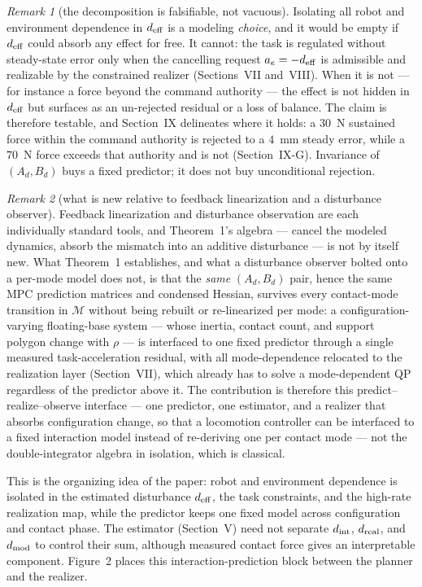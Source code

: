 \documentclass[journal]{IEEEtran}
\theoremstyle{plain}
\theoremstyle{definition}
\theoremstyle{remark}
\newtheorem*{remark}{Remark}
\newcommand{\deff}{d_{\rm eff}}
\begin{document}
\begin{remark}[the decomposition is falsifiable, not vacuous]
Isolating all robot and environment dependence in $\deff$ is a modeling \emph{choice}, and it would be empty if $\deff$ could absorb any effect for free. It cannot: the task is regulated without steady-state error only when the cancelling request $a_e=-\deff$ is admissible and realizable by the constrained realizer (Sections~VII and~VIII). When it is not --- for instance a force beyond the command authority --- the effect is not hidden in $\deff$ but surfaces as an un-rejected residual or a loss of balance. The claim is therefore testable, and Section~IX delineates where it holds: a $30$~N sustained force within the command authority is rejected to a $4$~mm steady error, while a $70$~N force exceeds that authority and is not (Section~IX-G). Invariance of $(A_d,B_d)$ buys a fixed predictor; it does not buy unconditional rejection.
\end{remark}

\begin{remark}[what is new relative to feedback linearization and a disturbance observer]
Feedback linearization and disturbance observation are each individually standard tools, and Theorem~1's algebra --- cancel the modeled dynamics, absorb the mismatch into an additive disturbance --- is not by itself new. What Theorem~1 establishes, and what a disturbance observer bolted onto a per-mode model does not, is that the \emph{same} $(A_d,B_d)$ pair, hence the same MPC prediction matrices and condensed Hessian, survives every contact-mode transition in $\mathcal M$ without being rebuilt or re-linearized per mode: a configuration-varying floating-base system --- whose inertia, contact count, and support polygon change with $\rho$ --- is interfaced to one fixed predictor through a single measured task-acceleration residual, with all mode-dependence relocated to the realization layer (Section~VII), which already has to solve a mode-dependent QP regardless of the predictor above it. The contribution is therefore this predict--realize--observe interface --- one predictor, one estimator, and a realizer that absorbs configuration change, so that a locomotion controller can be interfaced to a fixed interaction model instead of re-deriving one per contact mode --- not the double-integrator algebra in isolation, which is classical.
\end{remark}

This is the organizing idea of the paper: robot and environment dependence is isolated in the estimated disturbance $\deff$, the task constraints, and the high-rate realization map, while the predictor keeps one fixed model across configuration and contact phase. The estimator (Section~V) need not separate $d_{\rm int}$, $d_{\rm real}$, and $d_{\rm mod}$ to control their sum, although measured contact force gives an interpretable component. Figure~2 places this interaction-prediction block between the planner and the realizer.
\end{document}
